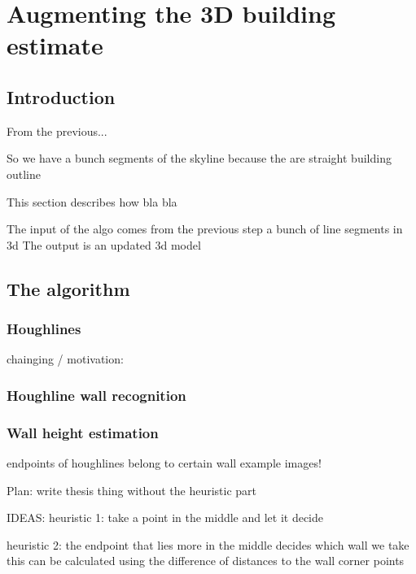 
\section{Augmenting the 3D building estimate}
\subsection{Introduction}


From the previous... 

So we have a bunch 
segments of the skyline 
because the are straight
building outline

This section describes how bla bla

The input of the algo comes from the previous step
a bunch of line segments in 3d
The output is an updated 3d model 




\subsection{The algorithm}
\subsubsection{Houghlines}
	chainging / motivation:


\subsubsection{Houghline wall recognition}
\subsubsection{Wall height estimation}




endpoints of houghlines belong to certain wall
example images!


Plan:
write thesis thing without the heuristic part

IDEAS:
heuristic 1:
take a point in the middle and let it decide

heuristic 2:
the endpoint that lies more in the middle decides which wall we take
this can be calculated using the difference of distances to the wall corner points

